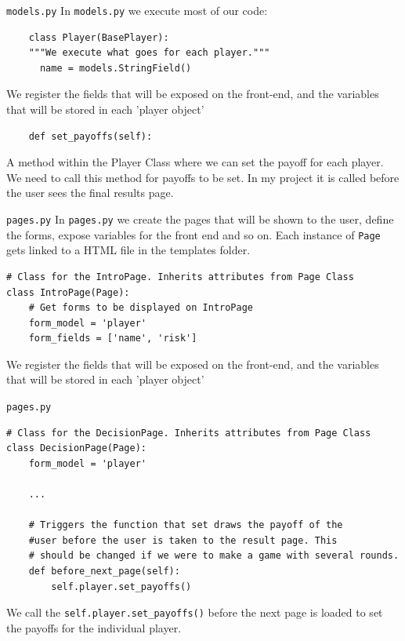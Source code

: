 \documentclass[10pt]{beamer}
\begin{document}
\begin{frame}[fragile]{\texttt{models.py}}
  In \texttt{models.py} we execute most of our code:
  \begin{verbatim}
    class Player(BasePlayer):
    """We execute what goes for each player."""
      name = models.StringField()
  \end{verbatim}

We register the fields that will be exposed on the front-end, and the variables that will be stored in each 'player object'

\begin{verbatim}
    def set_payoffs(self):
\end{verbatim}
A method within the Player Class where we can set the payoff for each player. We need to call this method for payoffs to be set. In my project it is called before the user sees the final results page. 
\end{frame}

\begin{frame}[fragile]{\texttt{pages.py}}
  In \texttt{pages.py} we create the pages that will be shown to the user, define the forms, expose variables for the front end and so on. Each instance of \texttt{Page} gets linked to a HTML file in the templates folder. 
  \begin{verbatim}
# Class for the IntroPage. Inherits attributes from Page Class
class IntroPage(Page):
    # Get forms to be displayed on IntroPage
    form_model = 'player'
    form_fields = ['name', 'risk']
  \end{verbatim}

We register the fields that will be exposed on the front-end, and the variables that will be stored in each 'player object'
\end{frame}

\begin{frame}[fragile]{\texttt{pages.py}}
  \begin{verbatim}
# Class for the DecisionPage. Inherits attributes from Page Class
class DecisionPage(Page):
    form_model = 'player'

    ...

    # Triggers the function that set draws the payoff of the
    #user before the user is taken to the result page. This
    # should be changed if we were to make a game with several rounds.
    def before_next_page(self):
        self.player.set_payoffs()
  \end{verbatim}

We call the \texttt{self.player.set_payoffs()} before the next page is loaded to set the payoffs for the individual player. 
\end{frame}
\end{document}
